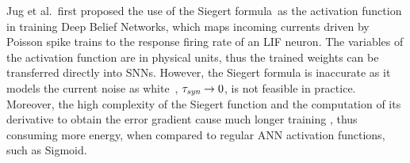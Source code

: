	Jug et al.~\DIFdelbegin {}\DIFdelend \DIFaddbegin {}\DIFaddend first proposed the use of the Siegert formula~\DIFdelbegin {}\DIFdelend \DIFaddbegin {}\DIFaddend as the activation function in training Deep Belief Networks, which maps incoming currents driven by Poisson spike trains to the response firing rate of an LIF neuron.
	The variables of the activation function are in physical units, thus the trained weights can be transferred directly into SNNs.
	However, the Siegert formula is inaccurate as it models the current noise as white~\DIFdelbegin {}\DIFdelend \DIFaddbegin {}\DIFaddend , $\tau_{\textit{\textrm{syn}}} \to 0$, \DIFdelbegin {}\DIFdelend \DIFaddbegin {}\DIFaddend is not feasible in practice.
	Moreover, the high complexity of the Siegert function and the computation of its derivative to obtain the error gradient cause much longer training \DIFdelbegin {}\DIFdelend \DIFaddbegin {}\DIFaddend , thus consuming more energy, when compared to regular ANN activation functions, such as Sigmoid.

